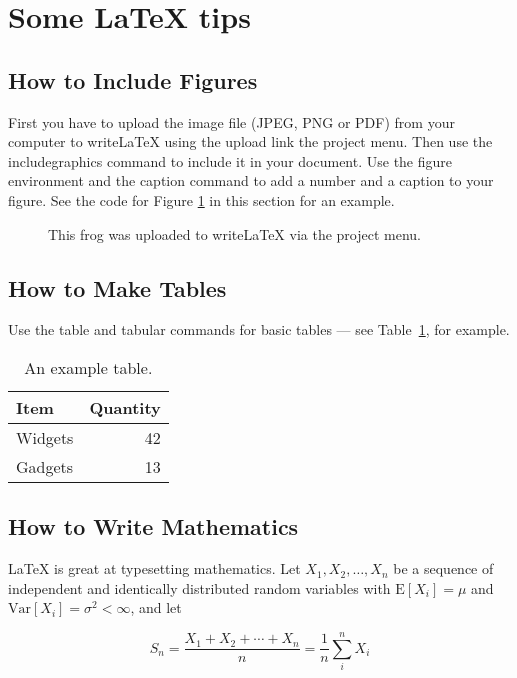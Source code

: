 \documentclass[a4paper]{article}
\begin{document}
\section{Some LaTeX tips}
\label{sec:latex}
\subsection{How to Include Figures}
      
First you have to upload the image file (JPEG, PNG or PDF) from your computer to writeLaTeX using the upload link the project menu. Then use the includegraphics command to include it in your document. Use the figure environment and the caption command to add a number and a caption to your figure. See the code for Figure \ref{fig:frog} in this section for an example.
      
\begin{figure}
	\centering
	\caption{\label{fig:frog}This frog was uploaded to writeLaTeX via the project menu.}
\end{figure}
      
\subsection{How to Make Tables}
      
Use the table and tabular commands for basic tables --- see Table~\ref{tab:widgets}, for example.
      
\begin{table}
	\centering
	\begin{tabular}{l|r}
		Item    & Quantity \\\hline
		Widgets & 42       \\
		Gadgets & 13       
	\end{tabular}
	\caption{\label{tab:widgets}An example table.}
\end{table}
      
\subsection{How to Write Mathematics}
      
\LaTeX{} is great at typesetting mathematics. Let $X_1, X_2, \ldots, X_n$ be a sequence of independent and identically distributed random variables with $\text{E}[X_i] = \mu$ and $\text{Var}[X_i] = \sigma^2 < \infty$, and let
      
\begin{equation}
	S_n = \frac{X_1 + X_2 + \cdots + X_n}{n}
	= \frac{1}{n}\sum_{i}^{n} X_i
	\label{eq:sn}
\end{equation}
      
\end{document}
